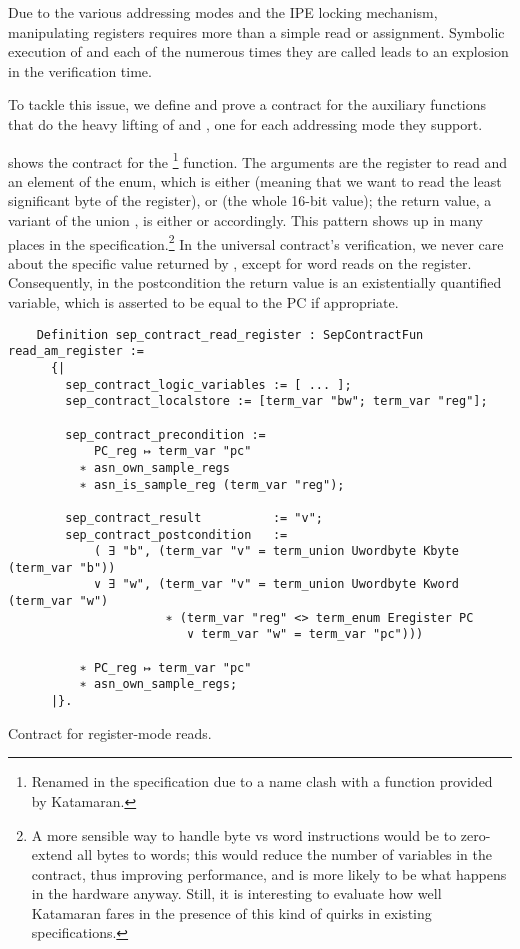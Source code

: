 Due to the various addressing modes and the IPE locking mechanism, manipulating registers requires more than a simple read or assignment. Symbolic execution of  and  each of the numerous times they are called leads to an explosion in the verification time.

To tackle this issue, we define and prove a contract for the auxiliary functions that do the heavy lifting of  and , one for each addressing mode they support.

 shows the contract for the \footnote{Renamed  in the \usail specification due to a name clash with a function provided by Katamaran.} function. The arguments are the register to read and an element of the  enum, which is either  (meaning that we want to read the least significant byte of the register), or  (the whole 16-bit value); the return value, a variant of the union , is either  or  accordingly. This pattern shows up in many places in the \msp \usail specification.\footnote{A more sensible way to handle byte vs word instructions would be to zero-extend all bytes to words; this would reduce the number of variables in the contract, thus improving performance, and is more likely to be what happens in the hardware anyway. Still, it is interesting to evaluate how well Katamaran fares in the presence of this kind of quirks in existing specifications.} In the universal contract's verification, we never care about the specific value returned by , except for word reads on the  register. Consequently, in the postcondition the return value is an existentially quantified variable, which is asserted to be equal to the PC if appropriate.

\begin{listing}
  \begin{verbatim}
    Definition sep_contract_read_register : SepContractFun read_am_register :=
      {|
        sep_contract_logic_variables := [ ... ];
        sep_contract_localstore := [term_var "bw"; term_var "reg"];

        sep_contract_precondition :=
            PC_reg ↦ term_var "pc"
          ∗ asn_own_sample_regs
          ∗ asn_is_sample_reg (term_var "reg");

        sep_contract_result          := "v";
        sep_contract_postcondition   :=
            ( ∃ "b", (term_var "v" = term_union Uwordbyte Kbyte (term_var "b"))
            ∨ ∃ "w", (term_var "v" = term_union Uwordbyte Kword (term_var "w")
                      ∗ (term_var "reg" <> term_enum Eregister PC
                         ∨ term_var "w" = term_var "pc")))

          ∗ PC_reg ↦ term_var "pc"
          ∗ asn_own_sample_regs;
      |}.
  \end{verbatim}
  \caption{Contract for register-mode reads.}
  \label{lst:read_register}
\end{listing}


